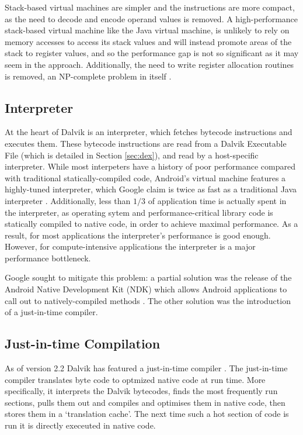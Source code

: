 Stack-based virtual machines are simpler and the instructions are more compact, as the need to decode and encode operand values is removed. A high-performance stack-based virtual machine like the Java virtual machine, is unlikely to rely on memory accesses to access its stack values and will instead promote areas of the stack to register values, and so the performance gap is not so significant as it may seem in the \naive approach. Additionally, the need to write register allocation routines is removed, an NP-complete problem in itself \cite{chaitin82}.

\subsection*{Interpreter}

At the heart of Dalvik is an interpreter, which fetches bytecode instructions and executes them. These bytecode instructions are read from a Dalvik Executable File (which is detailed in Section \ref{sec:dex}), and read by a host-specific interpreter. While most interpeters have a history of poor performance compared with traditional statically-compiled code, Android's virtual machine features a highly-tuned interpreter, which Google claim is twice as fast as a traditional Java interpreter \cite{android_22}. Additionally, less than $1/3$ of application time is actually spent in the interpreter, as operating sytem and performance-critical library code is statically compiled to native code, in order to achieve maximal performance. As a result, for most applications the interpreter's performance is good enough. However, for compute-intensive applications the interpreter is a major performance bottleneck.

Google sought to mitigate this problem: a partial solution was the release of the Android Native Development Kit (NDK) which allows Android applications to call out to natively-compiled methods \cite{android_22}. The other solution was the introduction of a just-in-time compiler.

\subsection*{Just-in-time Compilation}

As of version 2.2 Dalvik has featured a just-in-time compiler \cite{android_22}. The just-in-time compiler translates byte code to optmized native code at run time. More specifically, it interprets the Dalvik bytecodes, finds the most frequently run sections, pulls them out and compiles and optimises them in native code, then stores them in a `translation cache'. The next time such a hot section of code is run it is directly execeuted in native code.

